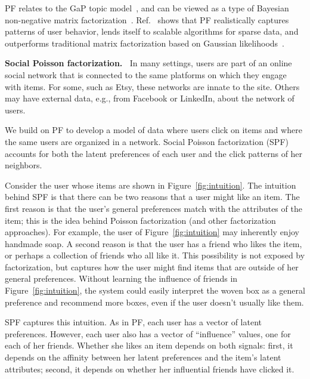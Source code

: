 \documentclass{sig-alternate-2013}
\newcommand{\mypar}[1]{\vspace{0.05in} \noindent \textbf{#1 \,}}
\begin{document}
PF relates to the GaP topic model~\cite{CannyGaP}, and can be viewed
as a type of Bayesian non-negative matrix factorization~\cite{Lee00}.
Ref.~\cite{poisMF} shows that PF realistically captures patterns of
user behavior, lends itself to scalable algorithms for sparse data,
and outperforms traditional matrix factorization based on Gaussian
likelihoods~\cite{poisMF,PMF}.

\mypar{Social Poisson factorization.} In many settings, users are part
of an online social network that is connected to the same platforms on
which they engage with items.  For some, such as Etsy, these networks
are innate to the site.  Others may have external data, e.g., from
Facebook or LinkedIn, about the network of users.

We build on PF to develop a model of data where users click on items
and where the same users are organized in a network.  Social Poisson
factorization (SPF) accounts for both the latent preferences of each
user and the click patterns of her neighbors.

Consider the user whose items are shown in
Figure~\ref{fig:intuition}.  The intuition behind SPF is
that there can be two reasons that a user might like an item.  The
first reason is that the user's general preferences match with the
attributes of the item; this is the idea behind Poisson factorization
(and other factorization approaches).  For example, the user of
Figure~\ref{fig:intuition} may inherently enjoy handmade
soap.  A second reason is that the user has a
friend who likes the item, or perhaps a collection of friends who all
like it.  This possibility is not exposed by factorization, but
captures how the user might find items that are outside of her general
preferences.
Without learning the influence of friends in Figure~\ref{fig:intuition},
the system could easily interpret the woven box as a general
preference and recommend more boxes, even if the user
doesn't usually like them.

SPF captures this intuition.  As in PF, each user
has a vector of latent preferences. However, each user also has a
vector of ``influence'' values, one for each of her friends.  Whether
she likes an item depends on both signals: first, it depends on the
affinity between her latent preferences and the item's latent
attributes; second, it depends on whether her influential friends have
clicked it.
\end{document}
